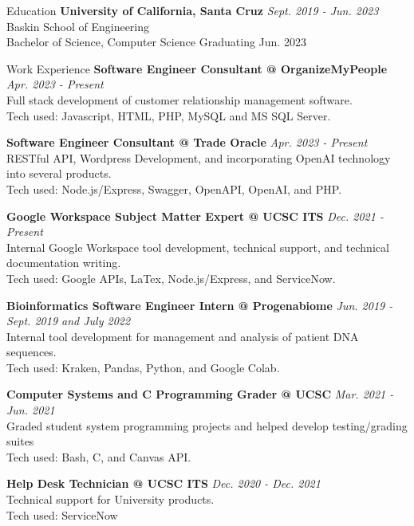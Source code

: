 \documentclass{resume} %
\begin{document}
\begin{rSection}{Education}
    {\bf{University of California, Santa Cruz}}
    \hfill{\em Sept. 2019 - Jun. 2023}
    \\ Baskin School of Engineering
    \\ Bachelor of Science, Computer Science \hfill{ Graduating Jun. 2023 }
\end{rSection}

\begin{rSection}{Work Experience}
    {\bf{Software Engineer Consultant} @ OrganizeMyPeople}
    \hfill{\em Apr. 2023 - Present}
    \\ Full stack development of customer relationship management software.
    \\ Tech used: Javascript, HTML, PHP, MySQL and MS SQL Server.

    {\bf{Software Engineer Consultant} @  Trade Oracle}
    \hfill{\em Apr. 2023 - Present}
    \\ RESTful API, Wordpress Development, and incorporating OpenAI technology into several products.
    \\ Tech used: Node.js/Express, Swagger, OpenAPI, OpenAI, and PHP. 

    {\bf{Google Workspace Subject Matter Expert} @ UCSC ITS }
    \hfill{\em Dec. 2021 - Present}
    \\ Internal Google Workspace tool development, technical support, and technical documentation writing.
    \\ Tech used: Google APIs, LaTex, Node.js/Express, and ServiceNow.

    {\bf{Bioinformatics Software Engineer Intern} @ Progenabiome}
    \hfill{\em Jun. 2019 - Sept. 2019 and July 2022}
    \\ Internal tool development for management and analysis of patient DNA sequences.
    \\ Tech used: Kraken, Pandas, Python, and Google Colab.


    {\bf{Computer Systems and C Programming Grader} @ UCSC}
    \hfill{\em Mar. 2021 - Jun. 2021}
    \\ Graded student system programming projects and helped develop testing/grading suites
    \\ Tech used: Bash, C, and Canvas API.

    {\bf{Help Desk Technician} @ UCSC ITS}
    \hfill{\em Dec. 2020 - Dec. 2021}
    \\ Technical support for University products.
    \\ Tech used: ServiceNow

    
\end{rSection}
\end{document}
